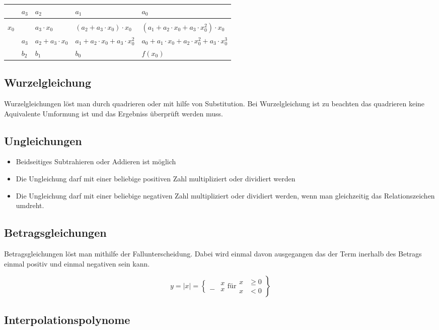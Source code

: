 
\begin{tabularx}{\linewidth}{l|XXXX}
& $a_3$ & $a_2$ & $a_1$ & $a_0$\\
\hline \\
$x_0$ & & $a_3\cdot x_0$ & $(a_2+a_3\cdot x_0)\cdot x_0$ &$(a_1+a_2\cdot x_0 +a_3\cdot x_0^2)\cdot x_0$ \\
& $a_3$ & $a_2+a_3\cdot x_0$ & $a_1+a_2\cdot x_0 + a_3\cdot x_0^2$ & $a_0+a_1\cdot x_0+a_2\cdot x_0^2+a_3\cdot x_0^3$\\
\hline
& $b_2$ & $b_1$ & $b_0$& $f(x_0)$
\end{tabularx}
\subsection{Wurzelgleichung}
Wurzelgleichungen löst man durch quadrieren oder mit hilfe von Substitution.
Bei Wurzelgleichung ist zu beachten das quadrieren keine Aquivalente Umformung ist und das 
Ergebniss überprüft werden muss.

\subsection{Ungleichungen}
\begin{itemize}
\item Beidseitiges Subtrahieren oder Addieren ist möglich
\item Die Ungleichung darf mit einer beliebige positiven Zahl multipliziert oder dividiert werden
\item Die Ungleichung darf mit einer beliebige negativen Zahl multipliziert oder dividiert werden, wenn man gleichzeitig das Relationszeichen umdreht.
\end{itemize}

\subsection{Betragsgleichungen}
Betragsgleichungen löst man mithilfe der Fallunterscheidung. Dabei wird einmal davon ausgegangen das der Term inerhalb des Betrags einmal positiv und einmal negativen
sein kann.   
\begin{shaded}
\begin{equation}
y=|x|=\left\{
\begin{aligned}
  &x \\
- &x 
\end{aligned}
\right. \text{für} \left. \begin{aligned}
x &\geq 0 \\
x &< 0 
\end{aligned} \right\} 
\end{equation}
\end{shaded}

\subsection{Interpolationspolynome}

